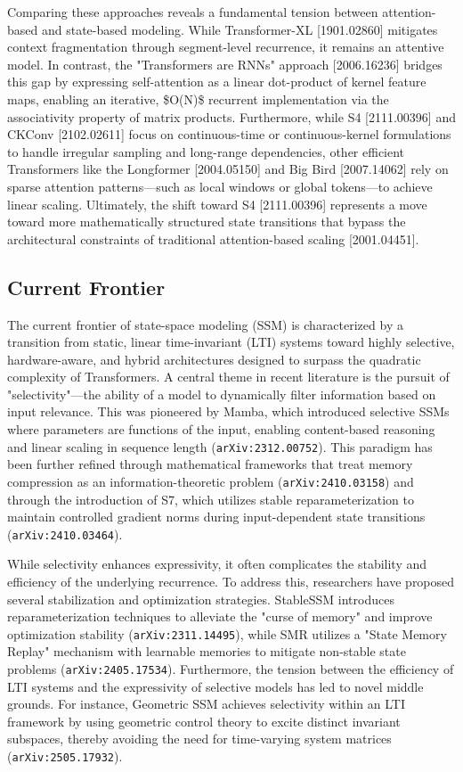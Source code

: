 \documentclass[11pt]{article}
\begin{document}
Comparing these approaches reveals a fundamental tension between attention-based and state-based modeling. While Transformer-XL [1901.02860] mitigates context fragmentation through segment-level recurrence, it remains an attentive model. In contrast, the "Transformers are RNNs" approach [2006.16236] bridges this gap by expressing self-attention as a linear dot-product of kernel feature maps, enabling an iterative, \$O(N)\$ recurrent implementation via the associativity property of matrix products. Furthermore, while S4 [2111.00396] and CKConv [2102.02611] focus on continuous-time or continuous-kernel formulations to handle irregular sampling and long-range dependencies, other efficient Transformers like the Longformer [2004.05150] and Big Bird [2007.14062] rely on sparse attention patterns—such as local windows or global tokens—to achieve linear scaling. Ultimately, the shift toward S4 [2111.00396] represents a move toward more mathematically structured state transitions that bypass the architectural constraints of traditional attention-based scaling [2001.04451].

\subsection{Current Frontier}

The current frontier of state-space modeling (SSM) is characterized by a transition from static, linear time-invariant (LTI) systems toward highly selective, hardware-aware, and hybrid architectures designed to surpass the quadratic complexity of Transformers. A central theme in recent literature is the pursuit of "selectivity"—the ability of a model to dynamically filter information based on input relevance. This was pioneered by Mamba, which introduced selective SSMs where parameters are functions of the input, enabling content-based reasoning and linear scaling in sequence length (\texttt{arXiv:2312.00752}). This paradigm has been further refined through mathematical frameworks that treat memory compression as an information-theoretic problem (\texttt{arXiv:2410.03158}) and through the introduction of S7, which utilizes stable reparameterization to maintain controlled gradient norms during input-dependent state transitions (\texttt{arXiv:2410.03464}).

While selectivity enhances expressivity, it often complicates the stability and efficiency of the underlying recurrence. To address this, researchers have proposed several stabilization and optimization strategies. StableSSM introduces reparameterization techniques to alleviate the "curse of memory" and improve optimization stability (\texttt{arXiv:2311.14495}), while SMR utilizes a "State Memory Replay" mechanism with learnable memories to mitigate non-stable state problems (\texttt{arXiv:2405.17534}). Furthermore, the tension between the efficiency of LTI systems and the expressivity of selective models has led to novel middle grounds. For instance, Geometric SSM achieves selectivity within an LTI framework by using geometric control theory to excite distinct invariant subspaces, thereby avoiding the need for time-varying system matrices (\texttt{arXiv:2505.17932}).
\end{document}
